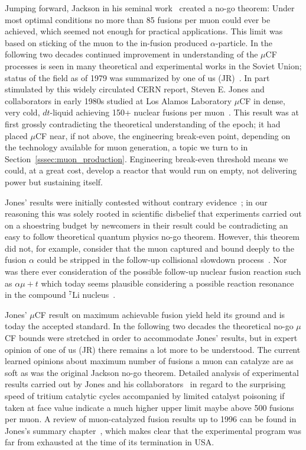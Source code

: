 \documentclass[particles,article,accept,pdftex,moreauthors]{Definitions/mdpi}
\newcommand{\rsec}[1]{Section~\ref{#1}}
\begin{document}
Jumping forward, Jackson in his seminal work~\cite{Jackson:1957zza} created a no-go theorem: Under most optimal conditions no more than 85 fusions per muon could ever be achieved, which seemed not enough for practical applications. This limit was based on sticking of the muon to the in-fusion produced $\alpha$-particle. In the following two decades continued improvement in understanding of the $\mu$CF processes is seen in many theoretical and experimental works in the Soviet Union; status of the field as of 1979 was summarized by one of us (JR)~\cite{Rafelski:1979ab}. In part stimulated by this widely circulated CERN report, Steven E. Jones and collaborators in early 1980s studied at Los Alamos Laboratory $\mu$CF in dense, very cold, $dt$-liquid achieving 150+ nuclear fusions per muon~\cite{Jones:1983pw,Jones:1986kk,Jones:1986Na}. This result was at first grossly contradicting the theoretical understanding of the epoch; it had placed $\mu$CF near, if not above, the engineering break-even point, depending on the technology available for muon generation, a topic we turn to in \rsec{sssec:muon_production}. Engineering break-even threshold means we could, at a great cost, develop a reactor that would run on empty, not delivering power but sustaining itself.

Jones' results were initially contested without contrary evidence~\cite{jones1993evaluation}; in our reasoning this was solely rooted in scientific disbelief that experiments carried out on a shoestring budget by newcomers in their result could be contradicting an easy to follow theoretical quantum physics no-go theorem. However, this theorem did not, for example, consider that the muon captured and bound deeply to the fusion $\alpha$ could be stripped in the follow-up collisional slowdown process~\cite{Rafelski:1988wq}. Nor was there ever consideration of the possible follow-up nuclear fusion reaction such as $\alpha\mu+t$ which today seems plausible considering a possible reaction resonance in the compound ${}^7\mathrm{Li}$ nucleus~\cite{Aprahamian:2025AA}. 

Jones' $\mu$CF result on maximum achievable fusion yield held its ground and is today the accepted standard. In the following two decades the theoretical no-go $\mu$CF bounds were stretched in order to accommodate Jones' results, but in expert opinion of one of us (JR) there remains a lot more to be understood. The current learned opinions about maximum number of fusions a muon can catalyze are as soft as was the original Jackson no-go theorem. Detailed analysis of experimental results carried out by Jones and his collaborators~\cite{jones1993evaluation} in regard to the surprising speed of tritium catalytic cycles accompanied by limited catalyst poisoning if taken at face value indicate a much higher upper limit maybe above 500 fusions per muon. A review of muon-catalyzed fusion results up to 1996 can be found in Jones's summary chapter~\cite{Jones1997}, which makes clear that the experimental program was far from exhausted at the time of its termination in USA. 
\end{document}
